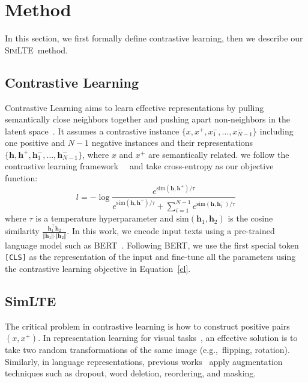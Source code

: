 \documentclass[11pt]{article}
\newcommand{\our}{\mbox{\textsc{SimLTE}}}
\begin{document}
\newpage
\section{Method}
\label{sec:method}
In this section, we first formally define contrastive learning, then we describe our \our~method.
\subsection{Contrastive Learning}
Contrastive Learning aims to learn effective representations by pulling semantically close neighbors together and pushing apart non-neighbors in the latent space~\cite{Hadsell2006DimensionalityRB}.
It assumes a contrastive instance $\{x, x^{+}, x_1^{-},\dots,x_{N-1}^{-}\}$ including one positive and $N-1$ negative instances and their representations $\{\mathbf{h}, \mathbf{h}^{+}, \mathbf{h}_1^{-}, \dots,
\mathbf{h}_{N-1}^{-}\}$, where $x$ and $x^{+}$ are semantically related.
we follow the contrastive learning framework~~\cite{Chen2020ASF, Li2022UCTopicUC} and take cross-entropy as our objective function:
\begin{equation}
\label{cl}
    l = -\log \frac{e^{\mathrm{sim}(\mathbf{h}, \mathbf{h}^{+})/\tau}}{e^{\mathrm{sim}(\mathbf{h}, \mathbf{h}^{+})/\tau}+ \sum_{i=1}^{N-1}e^{\mathrm{sim}(\mathbf{h}, \mathbf{h}_i^{-})/\tau}}
\end{equation}
where $\tau$ is a temperature hyperparameter and $\mathrm{sim}(\mathbf{h}_1, \mathbf{h}_2)$ is the cosine similarity $\frac{\mathbf{h}_1^{\top}\mathbf{h}_2}{\Vert \mathbf{h}_1 \Vert \cdot \Vert \mathbf{h}_2 \Vert}$.
In this work, we encode input texts using a pre-trained language model such as BERT~\cite{Devlin2019BERTPO}. Following BERT, we use the first special token \texttt{[CLS]} as the representation of the input and fine-tune all the parameters using the contrastive learning objective in Equation~\ref{cl}.

\subsection{SimLTE}
The critical problem in contrastive learning is how to construct positive pairs $(x, x^{+})$.
In representation learning for visual tasks~\cite{Chen2020ASF}, an effective solution is to take two random transformations of the same image (e.g.,~flipping, rotation).
Similarly, in language representations, previous works~\cite{Gao2021SimCSESC, Karpukhin2020DensePR, Meng2021COCOLMCA, Li2022UCTopicUC} apply augmentation techniques such as dropout, word deletion, reordering, and masking.
\end{document}
